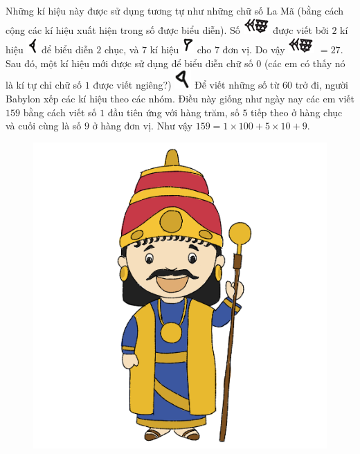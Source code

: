 \begin{multicols}{2}
	\vskip 0.1cm
	Những kí hiệu này được sử dụng tương tự như những chữ số La Mã (bằng cách cộng các kí hiệu xuất hiện trong số được biểu diễn). Số \includegraphics[scale=0.7]{18} được viết bởi $2$ kí hiệu \includegraphics[scale=0.7]{16} để biểu diễn $2$ chục, và $7$ kí hiệu \includegraphics[scale=0.7]{15}  cho $7$ đơn vị. Do vậy \includegraphics[scale=0.7]{18}  $=27$.
	\vskip 0.1cm
	Sau đó, một kí hiệu mới được sử dụng để biểu diễn chữ số $0$ (các em có thấy nó là kí tự chỉ chữ số $1$ được viết ngiêng?)
	\includegraphics[scale=0.65]{15.1}
	\vskip 0.1cm
	Để viết những số từ $60$ trở đi, người Babylon xếp các kí hiệu theo các nhóm. Điều này giống như ngày nay các em viết $159$ bằng cách viết số $1$ đầu tiên ứng với hàng trăm, số $5$ tiếp theo ở hàng chục và cuối cùng là số $9$ ở hàng đơn vị. Như vậy $159 = 1 \times 100+ 5 \times 10+ 9$.
	\vskip 0.1cm
	\begin{figure}[H]
		\centering
		\captionsetup{labelformat= empty, justification=centering}
		\includegraphics[width=0.85\linewidth]{20.12-pi.2}

\end{figure}
\end{multicols}
